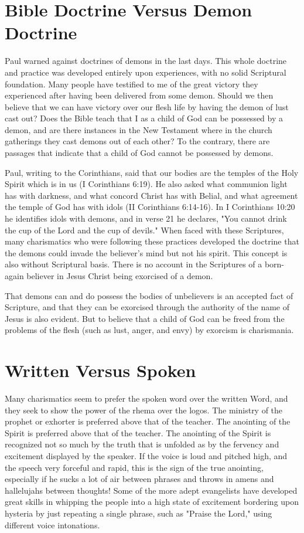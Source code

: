 \section*{Bible Doctrine Versus Demon Doctrine}

Paul warned against doctrines of demons in the last days. This whole doctrine and practice was developed entirely upon experiences, with no solid Scriptural foundation. Many people have testified to me of the great victory they experienced after having been delivered from some demon. Should we then believe that we can have victory over our flesh life by having the demon of lust cast out? Does the Bible teach that I as a child of God can be possessed by a demon, and are there instances in the New Testament where in the church gatherings they cast demons out of each other? To the contrary, there are passages that indicate that a child of God cannot be possessed by demons. 

Paul, writing to the Corinthians, said that our bodies are the temples of the Holy Spirit which is in us (I Corinthians 6:19). He also asked what communion light has with darkness, and what concord Christ has with Belial, and what agreement the temple of God has with idols (II Corinthians 6:14-16). In I Corinthians 10:20 he identifies idols with demons, and in verse 21 he declares, "You cannot drink the cup of the Lord and the cup of devils." When faced with these Scriptures, many charismatics who were following these practices developed the doctrine that the demons could invade the believer's mind but not his spirit. This concept is also without Scriptural basis. There is no account in the Scriptures of a born-again believer in Jesus Christ being exorcised of a demon. 

That demons can and do possess the bodies of unbelievers is an accepted fact of Scripture, and that they can be exorcised through the authority of the name of Jesus is also evident. But to believe that a child of God can be freed from the problems of the flesh (such as lust, anger, and envy) by exorcism is charismania. 

\section*{Written Versus Spoken}

Many charismatics seem to prefer the spoken word over the written Word, and they seek to show the power of the rhema over the logos. The ministry of the prophet or exhorter is preferred above that of the teacher. The anointing of the Spirit is preferred above that of the teacher. The anointing of the Spirit is recognized not so much by the truth that is unfolded as by the fervency and excitement displayed by the speaker. If the voice is loud and pitched high, and the speech very forceful and rapid, this is the sign of the true anointing, especially if he sucks a lot of air between phrases and throws in amens and hallelujahs between thoughts! Some of the more adept evangelists have developed great skills in whipping the people into a high state of excitement bordering upon hysteria by just repeating a single phrase, such as "Praise the Lord," using different voice intonations. 

